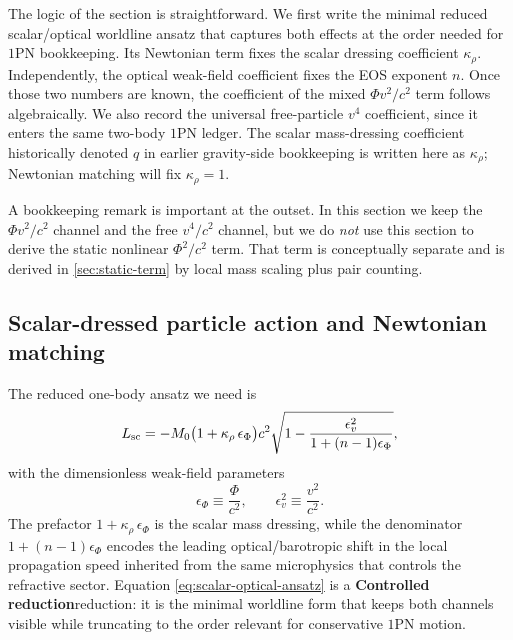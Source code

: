 \documentclass[11pt]{article}
\newcommand{\krho}{\kappa_{\rho}}
\newcommand{\PhiN}{\Phi}
\newcommand{\Controlled}{\textbf{Controlled reduction}}
\begin{document}
The logic of the section is straightforward. We first write the minimal reduced
scalar/optical worldline ansatz that captures both effects at the order needed for
\(1\)PN bookkeeping. Its Newtonian term fixes the scalar dressing coefficient \(\krho\).
Independently, the optical weak-field coefficient fixes the EOS exponent \(n\). Once
those two numbers are known, the coefficient of the mixed \(\PhiN v^2/c^2\) term follows
algebraically. We also record the universal free-particle \(v^4\) coefficient, since it
enters the same two-body \(1\)PN ledger.
The scalar mass-dressing coefficient historically denoted \(q\) in earlier gravity-side
bookkeeping is written here as \(\krho\); Newtonian matching will fix \(\krho=1\).

A bookkeeping remark is important at the outset. In this section we keep the
\(\PhiN v^2/c^2\) channel and the free \(v^4/c^2\) channel, but we do \emph{not} use this
section to derive the static nonlinear \(\PhiN^2/c^2\) term. That term is conceptually
separate and is derived in \cref{sec:static-term} by local mass scaling plus pair
counting.

\subsection{Scalar-dressed particle action and Newtonian matching}
\label{sec:kappa-rho-matching}

The reduced one-body ansatz we need is
\begin{equation}
L_{\rm sc}
=
-M_0\bigl(1+\krho\,\epsilon_\Phi\bigr)c^2
\sqrt{1-\frac{\epsilon_v^2}{1+(n-1)\epsilon_\Phi}},
\label{eq:scalar-optical-ansatz}
\end{equation}
with the dimensionless weak-field parameters
\begin{equation}
\epsilon_\Phi \equiv \frac{\PhiN}{c^2},
\qquad
\epsilon_v^2 \equiv \frac{v^2}{c^2}.
\label{eq:eps-defs}
\end{equation}
The prefactor \(1+\krho\,\epsilon_\Phi\) is the scalar mass dressing, while the denominator
\(1+(n-1)\epsilon_\Phi\) encodes the leading optical/barotropic shift in the local
propagation speed inherited from the same microphysics that controls the refractive
sector. Equation \eqref{eq:scalar-optical-ansatz} is a \Controlled reduction: it is the
minimal worldline form that keeps both channels visible while truncating to the order
relevant for conservative \(1\)PN motion.
\end{document}
